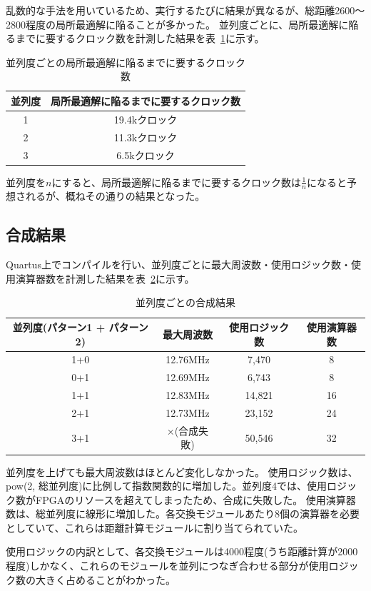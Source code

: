 乱数的な手法を用いているため、実行するたびに結果が異なるが、総距離2600～2800程度の局所最適解に陥ることが多かった。
並列度ごとに、局所最適解に陥るまでに要するクロック数を計測した結果を表~\ref{tab:time}に示す。
\begin{table}
    \begin{center}
        \caption{並列度ごとの局所最適解に陥るまでに要するクロック数}\label{tab:time}
        \begin{tabular}{|c|c|}
            \hline
            並列度 & 局所最適解に陥るまでに要するクロック数 \\ \hline
            1      & 19.4kクロック                     \\ \hline
            2      & 11.3kクロック                       \\ \hline
            3      & 6.5kクロック                       \\ \hline
        \end{tabular}
    \end{center}
\end{table}
並列度を$n$にすると、局所最適解に陥るまでに要するクロック数は$\frac{1}{n}$になると予想されるが、概ねその通りの結果となった。
\subsection{合成結果}\label{sec:compile}
Quartus上でコンパイルを行い、並列度ごとに最大周波数・使用ロジック数・使用演算器数を計測した結果を表~\ref{tab:compile}に示す。
\begin{table}
    \begin{center}
        \caption{並列度ごとの合成結果}\label{tab:compile}
        \begin{tabular}{|c|c|c|c|}
            \hline
            並列度(パターン1 + パターン2) & 最大周波数 & 使用ロジック数 & 使用演算器数 \\ \hline
            1+0      & 12.76MHz    &  7,470          & 8       \\ \hline
            0+1      & 12.69MHz    &  6,743          & 8       \\ \hline
            1+1      & 12.83MHz    & 14,821          & 16       \\ \hline
            2+1      & 12.73MHz    & 23,152          & 24       \\ \hline
            3+1      & ×(合成失敗)        & 50,546          & 32       \\ \hline
        \end{tabular}
    \end{center}
\end{table}

並列度を上げても最大周波数はほとんど変化しなかった。
使用ロジック数は、pow(2, 総並列度)に比例して指数関数的に増加した。並列度4では、使用ロジック数がFPGAのリソースを超えてしまったため、合成に失敗した。
使用演算器数は、総並列度に線形に増加した。各交換モジュールあたり8個の演算器を必要としていて、これらは距離計算モジュールに割り当てられていた。

使用ロジックの内訳として、各交換モジュールは4000程度(うち距離計算が2000程度)しかなく、これらのモジュールを並列につなぎ合わせる部分が使用ロジック数の大きく占めることがわかった。
